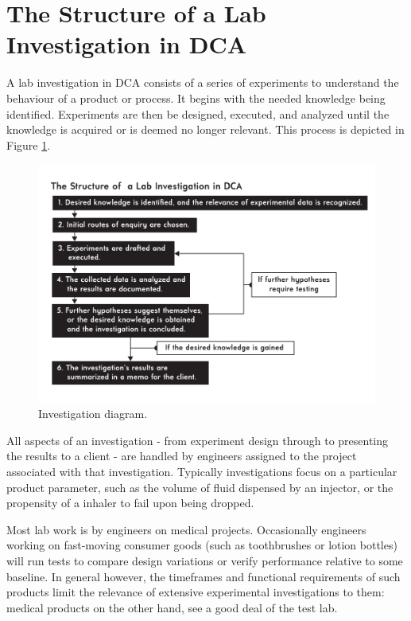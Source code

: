 \documentclass[11pt,a4paper,article]{memoir} %
\newlength\drop
\begin{document}
\section{The Structure of a Lab Investigation in DCA}
A lab investigation in DCA consists of a series of experiments to understand the behaviour of a product or process. It begins with the needed knowledge being identified. Experiments are then be designed, executed, and analyzed until the knowledge is acquired or is deemed no longer relevant. This process is depicted in Figure \ref{fig:investigation_diagram}.
\begin{figure}[h!]
\centering
\includegraphics[width=1.2\textwidth]{Lab_Investigation_Diagram.pdf}
\caption{Investigation diagram.}
\label{fig:investigation_diagram}
\end{figure}
All aspects of an investigation - from experiment design through to presenting the results to a client - are handled by engineers assigned to the project associated with that investigation. Typically investigations focus on a particular product parameter, such as the volume of fluid dispensed by an injector, or the propensity of a inhaler to fail upon being dropped. 
\par
Most lab work is by engineers on medical projects. Occasionally engineers working on fast-moving consumer goods (such as toothbrushes or lotion bottles) will run tests to compare design variations or verify performance relative to some baseline. In general however, the timeframes and functional requirements of such products limit the relevance of extensive experimental investigations to them: medical products on the other hand, see a good deal of the test lab.
\end{document}
